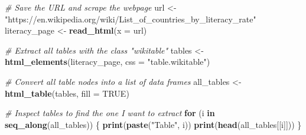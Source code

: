\documentclass[
]{article}
\newenvironment{Shaded}{\begin{snugshade}}{\end{snugshade}}
\newcommand{\AttributeTok}[1]{\textcolor[rgb]{0.13,0.29,0.53}{#1}}
\newcommand{\CommentTok}[1]{\textcolor[rgb]{0.56,0.35,0.01}{\textit{#1}}}
\newcommand{\ConstantTok}[1]{\textcolor[rgb]{0.56,0.35,0.01}{#1}}
\newcommand{\ControlFlowTok}[1]{\textcolor[rgb]{0.13,0.29,0.53}{\textbf{#1}}}
\newcommand{\FunctionTok}[1]{\textcolor[rgb]{0.13,0.29,0.53}{\textbf{#1}}}
\newcommand{\NormalTok}[1]{#1}
\newcommand{\OtherTok}[1]{\textcolor[rgb]{0.56,0.35,0.01}{#1}}
\newcommand{\StringTok}[1]{\textcolor[rgb]{0.31,0.60,0.02}{#1}}
\begin{document}
\begin{Shaded}
\begin{Highlighting}[]
\CommentTok{\# Save the URL and scrape the webpage}
\NormalTok{url }\OtherTok{\textless{}{-}} \StringTok{"https://en.wikipedia.org/wiki/List\_of\_countries\_by\_literacy\_rate"}
\NormalTok{literacy\_page }\OtherTok{\textless{}{-}} \FunctionTok{read\_html}\NormalTok{(}\AttributeTok{x =}\NormalTok{ url)}

\CommentTok{\# Extract all tables with the class "wikitable"}
\NormalTok{tables }\OtherTok{\textless{}{-}} \FunctionTok{html\_elements}\NormalTok{(literacy\_page, }\AttributeTok{css =} \StringTok{"table.wikitable"}\NormalTok{)}

\CommentTok{\# Convert all table nodes into a list of data frames}
\NormalTok{all\_tables }\OtherTok{\textless{}{-}} \FunctionTok{html\_table}\NormalTok{(tables, }\AttributeTok{fill =} \ConstantTok{TRUE}\NormalTok{)}

\CommentTok{\# Inspect tables to find the one I want to extract}
\ControlFlowTok{for}\NormalTok{ (i }\ControlFlowTok{in} \FunctionTok{seq\_along}\NormalTok{(all\_tables)) \{}
  \FunctionTok{print}\NormalTok{(}\FunctionTok{paste}\NormalTok{(}\StringTok{"Table"}\NormalTok{, i))}
  \FunctionTok{print}\NormalTok{(}\FunctionTok{head}\NormalTok{(all\_tables[[i]]))}
\NormalTok{\}}
\end{Highlighting}
\end{Shaded}
\end{document}
